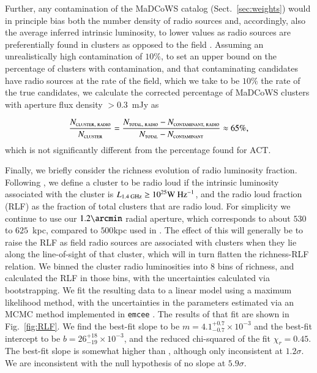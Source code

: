 \documentclass[longauth]{aa} %
\newcommand{\madcows}{MaDCoWS\xspace}
\begin{document}
Further, any contamination of the \madcows catalog (Sect.~\ref{sec:weights}) would in principle bias both the number density of radio sources and, accordingly, also the average inferred intrinsic luminosity, to lower values as radio sources are preferentially found in clusters as opposed to the field \citep{Coble2007}. Assuming an unrealistically high contamination of $10\%$, to set an upper bound on the percentage of clusters with contamination, and that contaminating candidates have radio sources at the rate of the field, which we take to be $10\%$ the rate of the true candidates, we calculate the corrected percentage of \madcows clusters with aperture flux density $>0.3$~mJy as

\begin{equation*}
    \frac{N_{\textsc{cluster, radio}}}{N_{\textsc{cluster}}} = \frac{N_{\textsc{total, radio}}-N_{\textsc{contaminant, radio}}}{N_{\textsc{total}}-N_{\textsc{contaminant}}} \approx 65\%,
\end{equation*}
which is not significantly different from the percentage found for ACT.

Finally, we briefly consider the richness evolution of radio luminosity fraction. Following \citet{Mo2020}, we define a cluster to be radio loud if the intrinsic luminosity associated with the cluster is $L_{\textsc{1.4~GHz}} \geq 10^{25} \textsc{W Hz}^{-1}$, and the radio loud fraction (RLF) as the fraction of total clusters that are radio loud. For simplicity we continue to use our $1.2\arcmin$ radial aperture, which corresponds to about $530$ to $625$~kpc, compared to $500$kpc used in \citet{Mo2020}. The effect of this will generally be to raise the RLF as field radio sources are associated with clusters when they lie along the line-of-sight of that cluster, which will in turn flatten the richness-RLF relation. We binned the cluster radio luminosities into 8 bins of richness, and calculated the RLF in those bins, with the uncertainties calculated via bootstrapping. We fit the resulting data to a linear model using a maximum likelihood method, with the uncertainties in the parameters estimated via an MCMC method implemented in \texttt{emcee} \citep{MacKey2013}. The results of that fit are shown in Fig.~\ref{fig:RLF}. We find the best-fit slope to be $m  = 4.1^{+0.7}_{-0.7}\times 10^{-3}$ and the best-fit intercept to be $b = 26^{+18}_{-19}\times 10^{-3}$, and the reduced chi-squared of the fit $\chi_r = 0.45$. The best-fit slope is somewhat higher than \citet{Mo2020}, although only inconsistent at $1.2\sigma$. We are inconsistent with the null hypothesis of no slope at $5.9\sigma$.
\end{document}
